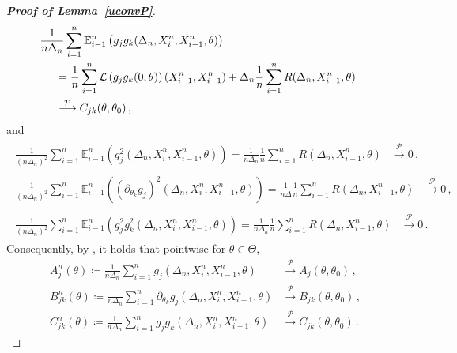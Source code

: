 \documentclass[11pt,a4paper]{article}
\newcommand{\xtl}{{X^n_{i-1}}}
\newcommand{\xtr}{X^n_i}
\newcommand{\thetan}{{\theta_0}}
\newcommand{\thetak}{{\theta_k}}
\newcommand{\EE}{{\mathbb E}}
\renewcommand{\ll}{{\mathcal{L}}}
\newcommand{\pp}{{\mathcal{P}}}
\numberwithin{equation}{section}
\numberwithin{theorem}{section}
\begin{document}
\begin{proof}[\textbf{Proof of Lemma~\ref{uconvP}}]
\begin{align}
\begin{split}
&\hspace{-5mm} \frac{1}{n\Delta_n} \sum_{i=1}^n \EE^n_{i-1}\left( g_jg_k(\Delta_n,\xtr,\xtl, \theta) \right) \\
&= \frac{1}{n} \sum_{i=1}^n \ll\left(g_jg_k(0,\theta)\right)(\xtl,\xtl) + \Delta_n\frac{1}{n}  \sum_{i=1}^n R(\Delta_n,\xtl, \theta) \\
&\overset{\pp}{\longrightarrow} C_{jk}(\theta, \thetan)\,,\label{EconC}\\
\end{split}
\end{align}
%
and
\begin{align*}
\begin{split}
\frac{1}{(n\Delta_n)^2}\sum_{i=1}^n \EE^n_{i-1}\left( g_j^2(\Delta_n, \xtr, \xtl, \theta)\right)  = \frac{1}{n\Delta_n} \frac{1}{n}\sum_{i=1}^nR(\Delta_n, \xtl, \theta) 
&\overset{\pp}{\longrightarrow} 0\,,\nonumber
\end{split}\\[0.5em]
\begin{split}
\frac{1}{(n\Delta_n)^2} \sum_{i=1}^n \EE^n_{i-1}\left( (\partial_{\thetak} g_j)^2 (\Delta_n,\xtr, \xtl, \theta)\right) =\frac{1}{n\Delta} \frac{1}{n} \sum_{i=1}^nR(\Delta_n, \xtl, \theta) &\overset{\pp}{\longrightarrow} 0\,,\nonumber
\end{split}\\[0.5em]
\begin{split}
\frac{1}{(n\Delta_n)^2} \sum_{i=1}^n \EE^n_{i-1}\left( g_j^2g_k^2(\Delta_n,\xtr,\xtl,     \theta) \right)= \frac{1}{n\Delta_n} \frac{1}{n}\sum_{i=1}^n R(\Delta_n, \xtl, \theta) &\overset{\pp}{\longrightarrow} 0\,.
\end{split}
\end{align*}
%
Consequently, by \cite[Lemma 9]{genoncatalot1993}, it holds that pointwise for $\theta \in \Theta$,
\begin{align*}
A^n_j(\theta) \coloneqq \frac{1}{n\Delta_n}\sum_{i=1}^n g_j(\Delta_n, \xtr, \xtl, \theta)  &\overset{\pp}{\longrightarrow} A_j(\theta, \thetan)\,,\nonumber\\
B^n_{jk}(\theta) \coloneqq \frac{1}{n\Delta_n} \sum_{i=1}^n \partial_{\thetak} g_j(\Delta_n,\xtr,
\xtl, \theta) &\overset{\pp}{\longrightarrow} B_{jk}(\theta,\thetan)\,,\nonumber\\
C^n_{jk}(\theta) \coloneqq \frac{1}{n\Delta_n}\sum_{i=1}^n g_jg_k(\Delta_n, \xtr, \xtl, \theta) &\overset{\pp}{\longrightarrow} C_{jk}(\theta,\thetan)\,.
\end{align*}

\end{proof}
\end{document}
